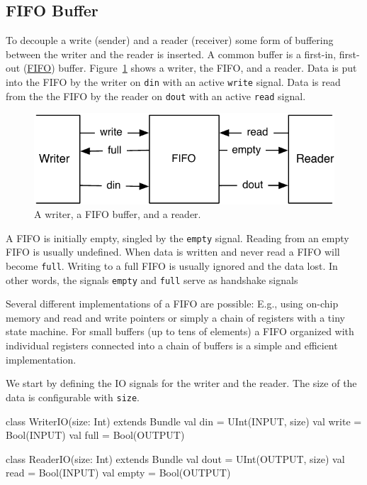 \documentclass[a4paper]{article}
\newcommand{\code}[1]{{\small{\texttt{#1}}}}
\begin{document}
\subsection{FIFO Buffer}

To decouple a write (sender) and a reader (receiver) some form
of buffering between the writer and the reader is inserted.
A common buffer is a first-in, first-out
(\href{https://en.wikipedia.org/wiki/FIFO_%28computing_and_electronics%29}{FIFO})
buffer. Figure~\ref{fig:fifo} shows a writer, the FIFO, and a reader.
Data is put into the FIFO by the writer on \code{din} with an active
\code{write} signal. Data is read from the the FIFO by the reader on
\code{dout} with an active \code{read} signal.

\begin{figure}
  \centering
  \includegraphics{figures/fifo}

  \caption{A writer, a FIFO buffer, and a reader.}
  \label{fig:fifo}
\end{figure}

A FIFO is initially empty, singled by the \code{empty} signal. Reading
from an empty FIFO is usually undefined. When data is written and never
read a FIFO will become \code{full}. Writing to a full FIFO is usually ignored
and the data lost. In other words, the signals \code{empty} and \code{full}
serve as handshake signals 

Several different implementations of a FIFO are possible: E.g., using on-chip
memory and read and write pointers or simply a chain of registers with a
tiny state machine. For small buffers (up to tens of elements) a FIFO organized
with individual registers connected into a chain of buffers is a simple and efficient
implementation.

We start by defining the IO signals for the writer and the reader. The size of
the data is configurable with \code{size}.

\begin{chisel}
class WriterIO(size: Int) extends Bundle {
  val din = UInt(INPUT, size)
  val write = Bool(INPUT)
  val full = Bool(OUTPUT)
}

class ReaderIO(size: Int) extends Bundle {
  val dout = UInt(OUTPUT, size)
  val read = Bool(INPUT)
  val empty = Bool(OUTPUT)
}
\end{chisel}
\end{document}

